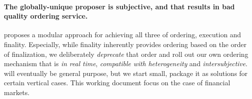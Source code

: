 \paragraph{The globally-unique proposer is subjective, and that results in bad quality ordering service.}

\sys proposes a modular approach for achieving all three of ordering, execution and finality.
Especially, while finality inherently provides ordering \ie based on the order of finalization, we deliberately \emph{deprecate} that order and roll out our own ordering mechanism that is \emph{in real time}, \emph{compatible with heterogeneity} and \emph{intersubjective}.
\sys will eventually be general purpose, but we start small, package it as solutions for certain vertical cases.
This working document focus on the case of financial markets.